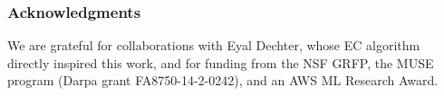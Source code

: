 \documentclass{article}
\begin{document}
\subsubsection*{Acknowledgments} We are grateful for collaborations with Eyal Dechter, whose EC algorithm directly inspired this work, and for funding from the NSF GRFP, the MUSE program (Darpa grant FA8750-14-2-0242),
and an AWS ML Research Award.



{\small }
\end{document}
